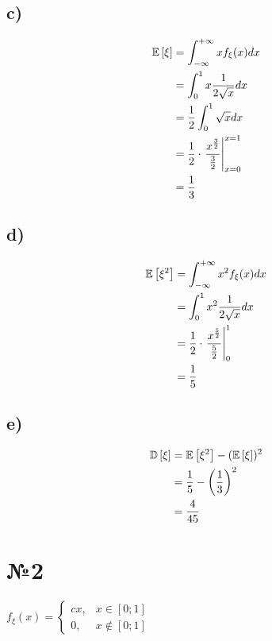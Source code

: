 \documentclass[a4paper, 10pt]{article}
\begin{document}
\subsection*{c)}
\begin{equation*}
    \begin{aligned}
        \mathbb{E}\left[\xi\right]&=\int_{-\infty}^{+\infty}xf_{\xi}(x)dx\\
        &=\int_0^1 x\frac{1}{2\sqrt{x}}dx\\
        &=\frac{1}{2}\int_0^1\sqrt{x}dx\\
        &=\frac{1}{2}\cdot\left.\frac{x^{\frac{3}{2}}}{\frac{3}{2}}\right\vert_{x=0}^{x=1}\\
        &=\frac{1}{3}
    \end{aligned}
\end{equation*}

\subsection*{d)}
\begin{equation*}
    \begin{aligned}
        \mathbb{E}\left[\xi^2\right]&=\int_{-\infty}^{+\infty} x^2f_{\xi}(x)dx\\
        &=\int_0^1 x^2\frac{1}{2\sqrt{x}}dx\\
        &=\frac{1}{2}\cdot\left.\frac{x^{\frac{5}{2}}}{\frac{5}{2}}\right\vert_{0}^1\\
        &=\frac{1}{5}
    \end{aligned}
\end{equation*}

\subsection*{e)}
\begin{equation*}
    \begin{aligned}
        \mathbb{D}\left[\xi\right]&=\mathbb{E}\left[\xi^2\right]-(\mathbb{E}\left[\xi\right])^2\\
        &=\frac{1}{5}-\left(\frac{1}{3}\right)^2\\
        &=\frac{4}{45}
    \end{aligned}
\end{equation*}


\section*{№2}
$f_{\xi}(x)=\begin{cases}
    cx,&x\in[0;1]\\
    0,&x\notin[0;1]
\end{cases}$
\end{document}
